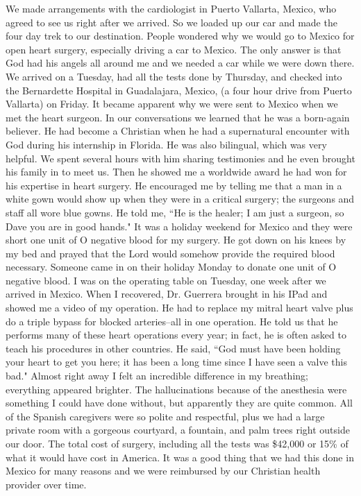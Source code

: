 \documentclass[oneside,12pt]{book}
\begin{document}
We made arrangements with the cardiologist in Puerto Vallarta, Mexico, who agreed to see us right after we arrived. So we loaded up our car and made the four day trek to our destination. People wondered why we would go to Mexico for open heart surgery, especially driving a car to Mexico. The only answer is that God had his angels all around me and we needed a car while we were down there. We arrived on a Tuesday, had all the tests done by Thursday, and checked into the Bernardette Hospital in Guadalajara, Mexico, (a four hour drive from Puerto Vallarta) on Friday. It became apparent why we were sent to Mexico when we met the heart surgeon. In our conversations we learned that he was a born-again believer. He had become a Christian when he had a supernatural encounter with God during his internship in Florida. He was also bilingual, which was very helpful. We spent several hours with him sharing testimonies and he even brought his family in to meet us. Then he showed me a worldwide award he had won for his expertise in heart surgery. He encouraged me by telling me that a man in a white gown would show up when they were in a critical surgery; the surgeons and staff all wore blue gowns. He told me, ``He is the healer; I am just a surgeon, so Dave you are in good hands." It was a holiday weekend for Mexico and they were short one unit of O negative blood for my surgery. He got down on his knees by my bed and prayed that the Lord would somehow provide the required blood necessary. Someone came in on their holiday Monday to donate one unit of O negative blood. I was on the operating table on Tuesday, one week after we arrived in Mexico.
When I recovered, Dr. Guerrera brought in his IPad and showed me a video of my operation. He had to replace my mitral heart valve plus do a triple bypass for blocked arteries--all in one operation. He told us that he performs many of these heart operations every year; in fact, he is often asked to teach his procedures in other countries. He said, ``God must have been holding your heart to get you here; it has been a long time since I have seen a valve this bad." Almost right away I felt an incredible difference in my breathing; everything appeared brighter. The hallucinations because of the anesthesia were something I could have done without, but apparently they are quite common. All of the Spanish caregivers were so polite and respectful, plus we had a large private room with a gorgeous courtyard, a fountain, and palm trees right outside our door. The total cost of surgery, including all the tests was \$42,000 or 15\% of what it would have cost in America. It was a good thing that we had this done in Mexico for many reasons and we were reimbursed by our Christian health provider over time. 
\end{document}
